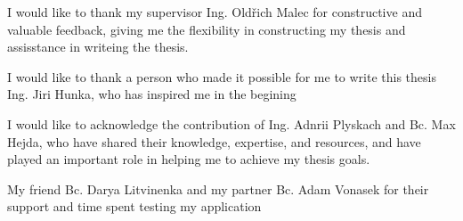I would like to thank my supervisor Ing. Oldřich Malec for constructive and valuable feedback, giving me the flexibility in constructing my thesis and assisstance in writeing the thesis. 

I would like to thank a person who made it possible for me to write this thesis Ing. Jiri Hunka, who has inspired me in the begining 

I would like to acknowledge the contribution of Ing. Adnrii Plyskach and Bc. Max Hejda, who have shared their knowledge, expertise, and resources, and have played an important role in helping me to achieve my thesis goals.

My friend Bc. Darya Litvinenka and my partner Bc. Adam Vonasek for their support and time spent testing my application